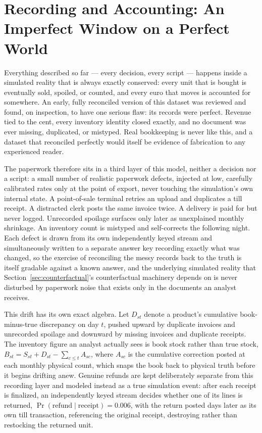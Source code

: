 \documentclass[12pt,a4paper]{article}
\begin{document}
\section{Recording and Accounting: An Imperfect Window on a Perfect World}
\label{sec:recording}

Everything described so far --- every decision, every script --- happens
inside a simulated reality that is always exactly conserved: every unit
that is bought is eventually sold, spoiled, or counted, and every euro
that moves is accounted for somewhere. An early, fully reconciled version
of this dataset was reviewed and found, on inspection, to have one
serious flaw: its records were perfect. Revenue tied to the cent, every
inventory identity closed exactly, and no document was ever missing,
duplicated, or mistyped. Real bookkeeping is never like this, and a
dataset that reconciled perfectly would itself be evidence of
fabrication to any experienced reader.

The paperwork therefore sits in a third layer of this model, neither a
decision nor a script: a small number of realistic paperwork defects,
injected at low, carefully calibrated rates only at the point of export,
never touching the simulation's own internal state. A point-of-sale
terminal retries an upload and duplicates a till receipt. A distracted
clerk posts the same invoice twice. A delivery is paid for but never
logged. Unrecorded spoilage surfaces only later as unexplained monthly
shrinkage. An inventory count is mistyped and self-corrects the
following night. Each defect is drawn from its own independently keyed
stream and simultaneously written to a separate answer key recording
exactly what was changed, so the exercise of reconciling the messy
records back to the truth is itself gradable against a known answer,
and the underlying simulated reality that Section~\ref{sec:counterfactual}'s
counterfactual machinery depends on is never disturbed by paperwork
noise that exists only in the documents an analyst receives.

This drift has its own exact algebra. Let $D_{st}$ denote a product's
cumulative book-minus-true discrepancy on day $t$, pushed upward by
duplicate invoices and unrecorded spoilage and downward by missing
invoices and duplicate receipts. The inventory figure an analyst actually
sees is book stock rather than true stock,
$B_{st} = S_{st} + D_{st} - \sum_{c\le t} A_{sc}$, where $A_{sc}$ is the
cumulative correction posted at each monthly physical count, which snaps
the book back to physical truth before it begins drifting anew. Genuine
refunds are kept deliberately separate from this recording layer and
modeled instead as a true simulation event: after each receipt is
finalized, an independently keyed stream decides whether one of its
lines is returned, $\Pr(\text{refund}\mid\text{receipt}) = 0.006$, with
the return posted days later as its own till transaction, referencing
the original receipt, destroying rather than restocking the returned
unit.
\end{document}
